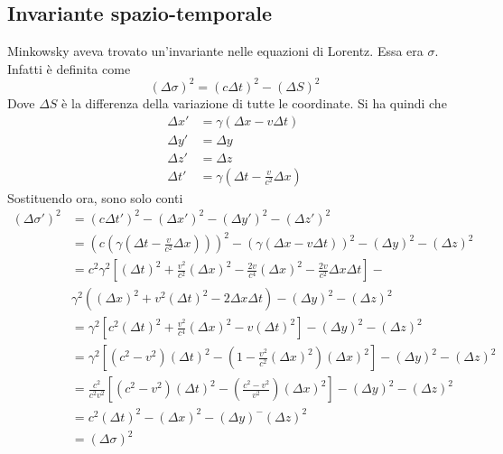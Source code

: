 \subsection{Invariante spazio-temporale}
Minkowsky aveva trovato un'invariante nelle equazioni di Lorentz. Essa era $\sigma$. Infatti è
definita come
\begin{equation*}
  {(\Delta\sigma)}^2={(c\Delta t)}^2-{(\Delta S)}^2
\end{equation*}
Dove $\Delta S$ è la differenza della variazione di tutte le coordinate. Si ha quindi che
\begin{align*}
  \Delta x' &= \gamma(\Delta x-v\Delta t)\\
  \Delta y' &= \Delta y\\
  \Delta z' &= \Delta z\\
  \Delta t' &= \gamma \left( \Delta t-\frac{v}{c^2}\Delta x \right)
\end{align*}
Sostituendo ora, sono solo conti
\begin{align*}
  {(\Delta\sigma')}^2 &= {(c\Delta t')}^2-{(\Delta x')}^2-{(\Delta y')}^2-{(\Delta z')}^2\\
                      &= {\left(c\left(\gamma \left( \Delta t-\frac{v}{c^2}\Delta x \right)\right)
                      \right)}^2-
  {\left( \gamma \left( \Delta x-v\Delta t \right) \right)}^2-{(\Delta y)}^2-{(\Delta z)}^2\\
  &= c^2\gamma^2 \left[ {(\Delta t)}^2+\frac{v^2}{c^2}{(\Delta x)}^2-\frac{2v}{c^4}{(\Delta x)}^2 -
  \frac{2v}{c^2}\Delta x\Delta t\right]-\\
  &\gamma^2({(\Delta x)}^2+v^2{(\Delta t)}^2-2\Delta x\Delta t)-{(\Delta y)}^2-{(\Delta z)}^2\\
  &=\gamma^2 \left[ c^2{(\Delta t)}^2+\frac{v^2}{c^4}{(\Delta x)}^2-v{(\Delta t)}^2 \right]-
  {(\Delta y)}^2-{(\Delta z)}^2\\
  &=\gamma^2 \left[ (c^2-v^2){(\Delta t)}^2-\left( 1-\frac{v^2}{c^2}
  {(\Delta x)}^2 \right){(\Delta x)}^2 \right]-{(\Delta y)}^2-
  {(\Delta z)}^2\\
  &=\frac{c^2}{c^2v^2}\left[ (c^2-v^2){(\Delta t)}^2-\left( \frac{c^2-v^2}{v^2}
  \right){(\Delta x)}^2 \right]-{(\Delta y)}^2-{(\Delta z)}^2\\
  &=c^2{(\Delta t)}^2-{(\Delta x)}^2-{(\Delta y)}^-{(\Delta z)}^2\\
  &={(\Delta\sigma)}^2
\end{align*}
